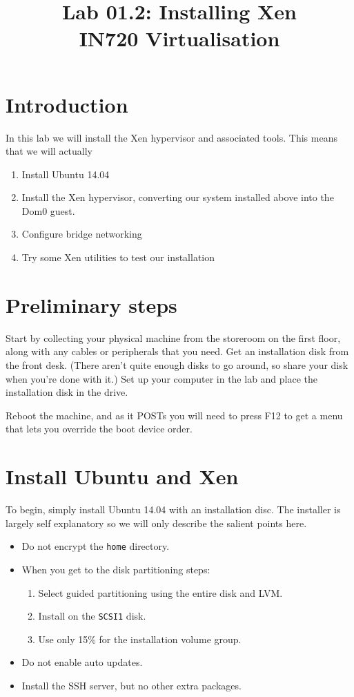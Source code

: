 \documentclass{article}
\begin{document}
\title{Lab 01.2: Installing Xen \\ IN720 Virtualisation}
\date{}
\maketitle

\section*{Introduction}
In this lab we will install the Xen hypervisor and associated tools. This means that we will actually

\begin{enumerate}
  \item Install Ubuntu 14.04 
  \item Install the Xen hypervisor, converting our system installed above into the Dom0 guest.
  \item Configure bridge networking 
  \item Try some Xen utilities to test our installation
\end{enumerate}

\section{Preliminary steps}
Start by collecting your physical machine from the storeroom on the first floor, along with any cables or peripherals that you need. Get an installation disk from the front desk. (There aren't quite enough disks to go around, so share your disk when you're done with it.) Set up your computer in the lab and place the installation disk in the drive.

Reboot the machine, and as it POSTs you will need to press F12 to get a menu that lets you override the boot device order.

\section{Install Ubuntu and Xen}
To begin, simply install Ubuntu 14.04 with an installation disc. The installer is largely self explanatory so we will only describe the salient points here.

\begin{itemize}
  \item Do not encrypt the \texttt{home} directory.
  \item When you get to the disk partitioning steps:
           \begin{enumerate}
             \item Select guided partitioning using the entire disk and LVM.
             \item Install on the \texttt{SCSI1} disk.
             \item Use only 15\% for the installation volume group.
           \end{enumerate}
   \item Do not enable auto updates.
   \item Install the SSH server, but no other extra packages.
 \end{itemize}
 
\end{document}
